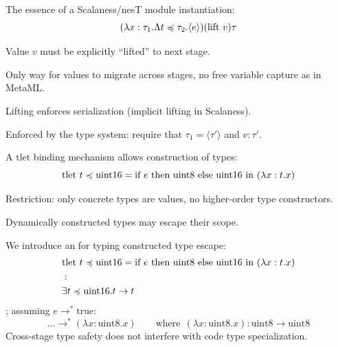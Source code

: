 
The essence of a Scalaness/nesT module instantiation:
{\Large
$$
(\lambda x : \tau_1 . \Lambda t \preccurlyeq \tau_2 . \langle e \rangle)(\mathrm{lift}\ v) \tau
$$
}
\begin{citemize}
\item Value $v$ must be explicitly ``lifted'' to next stage.
\begin{citemize}
\item Only way for values to migrate across stages, no free variable capture as in 
MetaML.
\item Lifting enforces serialization (implicit lifting in Scalaness).
\item Enforced by the type system: require that $\tau_1 = 
\langle \tau' \rangle$ and $v : \tau'$.
\end{citemize}
\end{citemize}
\stopslide


A $\mathrm{tlet}$ binding mechanism allows construction of types:
{\large
$$
\mathrm{tlet\ } t \preccurlyeq \mathrm{uint16} = \text{if }e \text{ then } \mathrm{uint8} \text{ else } \mathrm{uint16} 
\mathrm{\ in\ }(\lambda x : t . x)\\
$$
}
\begin{citemize}
\item Restriction: only concrete types are values, no higher-order type constructors.
\item Dynamically constructed types may escape their scope.
\end{citemize}
\stopslide


We introduce an  for typing constructed type escape:
{\large
\begin{eqnarray*}
&\mathrm{tlet\ } t \preccurlyeq \mathrm{uint16} = \text{if }e \text{ then } \mathrm{uint8} \text{ else } \mathrm{uint16} 
\mathrm{\ in\ }(\lambda x : t . x)\\
&: \\
&\exists t \preccurlyeq \mathrm{uint16} . t \rightarrow t
\end{eqnarray*}
}
; assuming $e \rightarrow^* \mathrm{true}$:
{\large
$$
\ldots \rightarrow^* (\lambda x : \mathrm{uint8} . x) 
\qquad \text{where} \ \ (\lambda x : \mathrm{uint8} . x) : \mathrm{uint8} \rightarrow
 \mathrm{uint8}
$$
}
Cross-stage type safety does not interfere with code type specialization.
\stopslide

